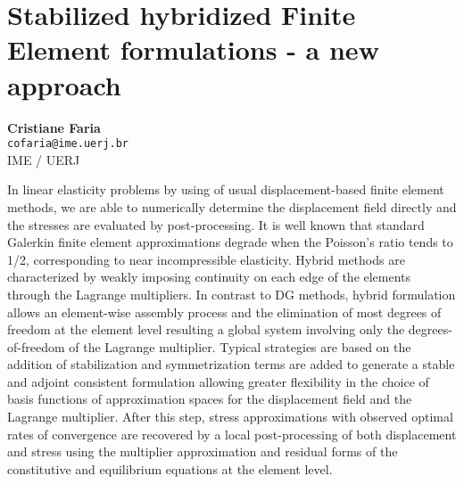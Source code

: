 
\section{Stabilized hybridized Finite Element formulations - a new approach}

\textbf{Cristiane Faria}\\
\texttt{\small{cofaria@ime.uerj.br}}\\
IME / UERJ

In linear elasticity problems by using of usual displacement-based finite element methods, we are able to numerically determine the displacement field directly and the stresses are evaluated by post-processing. It is well known that standard Galerkin finite element approximations degrade when the Poisson's ratio tends to 1/2, corresponding to near incompressible elasticity. Hybrid methods are characterized by weakly imposing continuity on each edge of the elements through the Lagrange multipliers. In contrast to DG methods, hybrid formulation allows an element-wise assembly process and the elimination of most degrees of freedom at the element level resulting a global system involving only the degrees-of-freedom of the Lagrange multiplier. Typical strategies are based on the addition of stabilization and symmetrization terms are added to generate a stable and adjoint consistent formulation allowing greater flexibility in the choice of basis functions of approximation spaces for the displacement field and the Lagrange multiplier. After this step, stress approximations with observed optimal rates of convergence are recovered by a local post-processing of both displacement and stress using the multiplier approximation and residual forms of the constitutive and equilibrium equations at the element level.

